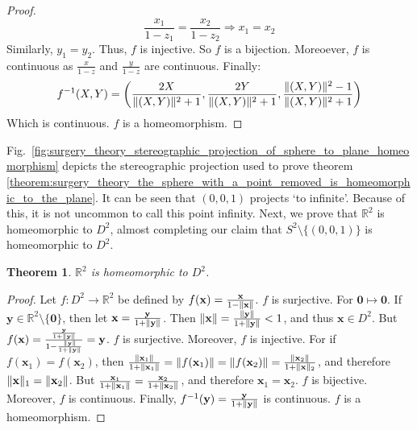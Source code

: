 \documentclass{article}
\theoremstyle{mystyle}
\newtheorem{theorem}{Theorem}[section]
\DeclarePairedDelimiter\norm{\lVert}{\rVert}
\begin{document}
\begin{proof}
\begin{equation*}
    \frac{x_{1}}{1-z_{1}} = \frac{x_{2}}{1-z_{2}} \Rightarrow x_{1} = x_{2}
\end{equation*}
Similarly, $y_{1} = y_{2}$. Thus, $f$ is injective. So $f$ is a bijection. Moreoever, $f$ is continuous as $\frac{x}{1-z}$ and $\frac{y}{1-z}$ are continuous. Finally:
\begin{equation*}
    f^{-1}(X,Y) = \bigg(\frac{2X}{\norm{(X,Y)}^{2}+1},\frac{2Y}{\norm{(X,Y)}^{2}+1},\frac{\norm{(X,Y)}^{2}-1}{\norm{(X,Y)}^{2}+1}\bigg)
\end{equation*}
Which is continuous. $f$ is a homeomorphism.
\end{proof}
Fig.~\ref{fig:surgery_theory_stereographic_projection_of_sphere_to_plane_homeomorphism} depicts the stereographic projection used to prove theorem \ref{theorem:surgery_theory_the_sphere_with_a_point_removed_is_homeomorphic_to_the_plane}. It can be seen that $(0,0,1)$ projects `to infinite'. Because of this, it is not uncommon to call this point infinity. Next, we prove that $\mathbb{R}^{2}$ is homeomorphic to $D^{2}$, almost completing our claim that $S^{2}\setminus \{(0,0,1)\}$ is homeomorphic to $D^{2}$.
\begin{theorem}
$\mathbb{R}^{2}$ is homeomorphic to $D^{2}$.
\end{theorem}
\begin{proof}
Let $f:D^{2}\rightarrow \mathbb{R}^{2}$ be defined by $f(\mathbf{x}) = \frac{\mathbf{x}}{1-\norm{\mathbf{x}}}$. $f$ is surjective. For $\mathbf{0}\mapsto \mathbf{0}$. If $\mathbf{y}\in \mathbb{R}^2\setminus \{\mathbf{0}\}$, then let $\mathbf{x} = \frac{\mathbf{y}}{1+\norm{\mathbf{y}}}$. Then $\norm{\mathbf{x}} = \frac{\norm{\mathbf{y}}}{1+\norm{\mathbf{y}}} < 1$, and thus $\mathbf{x}\in D^{2}$. But $f(\mathbf{x}) = \frac{\frac{\mathbf{y}}{1+\norm{\mathbf{y}}}}{1 - \frac{\norm{\mathbf{y}}}{1+\norm{\mathbf{y}}}} = \mathbf{y}$. $f$ is surjective. Moreover, $f$ is injective. For if $f(\mathbf{x}_{1}) = f(\mathbf{x}_{2})$, then $\frac{\norm{\mathbf{x}_{1}}}{1+\norm{\mathbf{x}_{1}}} = \norm{f(\mathbf{x}_{1})} = \norm{f(\mathbf{x}_{2})} = \frac{\norm{\mathbf{x}_{2}}}{1+\norm{\mathbf{x}}_{2}}$, and therefore $\norm{\mathbf{x}}_{1} = \norm{\mathbf{x}_{2}}$. But $\frac{\mathbf{x}_{1}}{1+\norm{\mathbf{x}_{1}}} = \frac{\mathbf{x}_{2}}{1+\norm{\mathbf{x}_{2}}}$, and therefore $\mathbf{x}_{1} = \mathbf{x}_{2}$. $f$ is bijective. Moreover, $f$ is continuous. Finally, $f^{-1}(\mathbf{y}) = \frac{\mathbf{y}}{1+\norm{\mathbf{y}}}$ is continuous. $f$ is a homeomorphism.
\end{proof}
\end{document}
